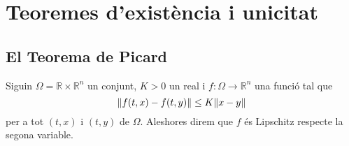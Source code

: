 \documentclass[../Apunts.tex]{subfiles}
\begin{document}
	\section{Teoremes d'existència i unicitat}
	\subsection{El Teorema de Picard}
	\begin{definition}
		\label{def:funció Lipschitz respecte la segona variable}
		Siguin \(\Omega=\mathbb{R}\times\mathbb{R}^{n}\) un conjunt, \(K>0\) un real i \(f\colon\Omega\longrightarrow\mathbb{R}^{n}\) una funció tal que
		\[\norm{f(t,x)-f(t,y)}\leq K\norm{x-y}\]
		per a tot \((t,x)\) i \((t,y)\) de \(\Omega\). Aleshores direm que \(f\) és Lipschitz respecte la segona variable.
	\end{definition}
\end{document}
